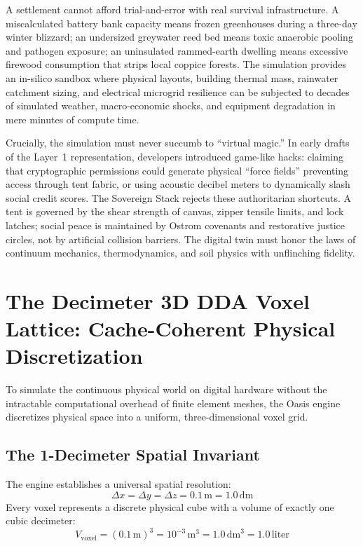A settlement cannot afford trial-and-error with real survival infrastructure. A miscalculated battery bank capacity means frozen greenhouses during a three-day winter blizzard; an undersized greywater reed bed means toxic anaerobic pooling and pathogen exposure; an uninsulated rammed-earth dwelling means excessive firewood consumption that strips local coppice forests. The simulation provides an in-silico sandbox where physical layouts, building thermal mass, rainwater catchment sizing, and electrical microgrid resilience can be subjected to decades of simulated weather, macro-economic shocks, and equipment degradation in mere minutes of compute time.

Crucially, the simulation must never succumb to ``virtual magic.'' In early drafts of the Layer~1 representation, developers introduced game-like hacks: claiming that cryptographic permissions could generate physical ``force fields'' preventing access through tent fabric, or using acoustic decibel meters to dynamically slash social credit scores. The Sovereign Stack rejects these authoritarian shortcuts. A tent is governed by the shear strength of canvas, zipper tensile limits, and lock latches; social peace is maintained by Ostrom covenants and restorative justice circles, not by artificial collision barriers. The digital twin must honor the laws of continuum mechanics, thermodynamics, and soil physics with unflinching fidelity.

\section{The Decimeter 3D DDA Voxel Lattice: Cache-Coherent Physical Discretization}

To simulate the continuous physical world on digital hardware without the intractable computational overhead of finite element meshes, the Oasis engine discretizes physical space into a uniform, three-dimensional voxel grid.

\subsection{The 1-Decimeter Spatial Invariant}

The engine establishes a universal spatial resolution:
\begin{equation}
\Delta x = \Delta y = \Delta z = 0.1\,\mathrm{m} = 1.0\,\mathrm{dm}
\label{eq:voxel_resolution}
\end{equation}
Every voxel represents a discrete physical cube with a volume of exactly one cubic decimeter:
\begin{equation}
V_{\mathrm{voxel}} = (0.1\,\mathrm{m})^3 = 10^{-3}\,\mathrm{m}^3 = 1.0\,\mathrm{dm}^3 = 1.0\,\mathrm{liter}
\label{eq:voxel_volume}
\end{equation}

